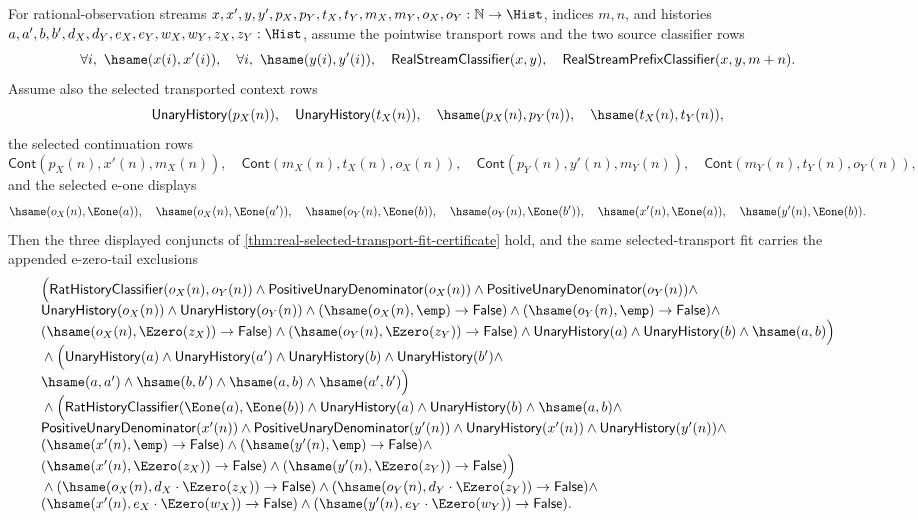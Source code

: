 \begin{theorem}
\label{thm:real-selected-transport-fit-appended-tail-certificate}
For rational-observation streams
$x,x',y,y',p_X,p_Y,t_X,t_Y,m_X,m_Y,o_X,o_Y:\mathbb{N}\to\Hist$,
indices $m,n$, and histories
$a,a',b,b',d_X,d_Y,e_X,e_Y,w_X,w_Y,z_X,z_Y:\Hist$, assume the pointwise
transport rows and the two source classifier rows
$$
\forall i,\ \hsame(x(i),x'(i)),\quad
\forall i,\ \hsame(y(i),y'(i)),\quad
\mathsf{RealStreamClassifier}(x,y),\quad
\mathsf{RealStreamPrefixClassifier}(x,y,m+n).
$$
Assume also the selected transported context rows
$$
\mathsf{UnaryHistory}(p_X(n)),\quad
\mathsf{UnaryHistory}(t_X(n)),\quad
\hsame(p_X(n),p_Y(n)),\quad
\hsame(t_X(n),t_Y(n)),
$$
the selected continuation rows
$$
\mathsf{Cont}(p_X(n),x'(n),m_X(n)),\quad
\mathsf{Cont}(m_X(n),t_X(n),o_X(n)),
\quad\mathsf{Cont}(p_Y(n),y'(n),m_Y(n)),\quad
\mathsf{Cont}(m_Y(n),t_Y(n),o_Y(n)),
$$
and the selected e-one displays
$$
\hsame(o_X(n),\Eone(a)),\quad
\hsame(o_X(n),\Eone(a')),\quad
\hsame(o_Y(n),\Eone(b)),\quad
\hsame(o_Y(n),\Eone(b')),\quad
\hsame(x'(n),\Eone(a)),\quad
\hsame(y'(n),\Eone(b)).
$$
Then the three displayed conjuncts of
\autoref{thm:real-selected-transport-fit-certificate} hold, and the same
selected-transport fit carries the appended e-zero-tail exclusions
$$
\begin{array}{l}
\Bigl(
\mathsf{RatHistoryClassifier}(o_X(n),o_Y(n))\land
\mathsf{PositiveUnaryDenominator}(o_X(n))\land
\mathsf{PositiveUnaryDenominator}(o_Y(n))\land\\
\mathsf{UnaryHistory}(o_X(n))\land
\mathsf{UnaryHistory}(o_Y(n))\land
(\hsame(o_X(n),\emp)\to\mathsf{False})\land
(\hsame(o_Y(n),\emp)\to\mathsf{False})\land\\
(\hsame(o_X(n),\Ezero(z_X))\to\mathsf{False})\land
(\hsame(o_Y(n),\Ezero(z_Y))\to\mathsf{False})\land
\mathsf{UnaryHistory}(a)\land \mathsf{UnaryHistory}(b)\land
\hsame(a,b)
\Bigr)\\
{}\land
\Bigl(
\mathsf{UnaryHistory}(a)\land
\mathsf{UnaryHistory}(a')\land
\mathsf{UnaryHistory}(b)\land
\mathsf{UnaryHistory}(b')\land\\
\hsame(a,a')\land
\hsame(b,b')\land
\hsame(a,b)\land
\hsame(a',b')
\Bigr)\\
{}\land
\Bigl(
\mathsf{RatHistoryClassifier}(\Eone(a),\Eone(b))\land
\mathsf{UnaryHistory}(a)\land
\mathsf{UnaryHistory}(b)\land
\hsame(a,b)\land\\
\mathsf{PositiveUnaryDenominator}(x'(n))\land
\mathsf{PositiveUnaryDenominator}(y'(n))\land
\mathsf{UnaryHistory}(x'(n))\land
\mathsf{UnaryHistory}(y'(n))\land\\
(\hsame(x'(n),\emp)\to\mathsf{False})\land
(\hsame(y'(n),\emp)\to\mathsf{False})\land\\
(\hsame(x'(n),\Ezero(z_X))\to\mathsf{False})\land
(\hsame(y'(n),\Ezero(z_Y))\to\mathsf{False})
\Bigr)\\
{}\land
(\hsame(o_X(n),d_X\cdot\Ezero(z_X))\to\mathsf{False})\land
(\hsame(o_Y(n),d_Y\cdot\Ezero(z_Y))\to\mathsf{False})\land\\
(\hsame(x'(n),e_X\cdot\Ezero(w_X))\to\mathsf{False})\land
(\hsame(y'(n),e_Y\cdot\Ezero(w_Y))\to\mathsf{False}).
\end{array}
$$
\end{theorem}
